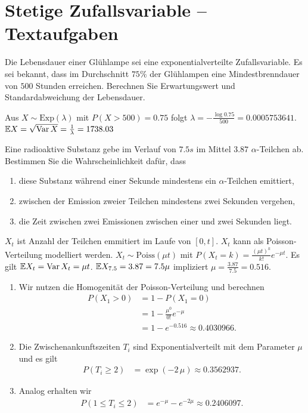 \section{Stetige Zufallsvariable -- Textaufgaben}

 Die Lebensdauer einer Glühlampe sei
eine exponentialverteilte Zufallsvariable.  Es sei bekannt, dass im Durchschnitt
$75\%$ der Glühlampen eine Mindestbrenndauer von $500$ Stunden erreichen.
Berechnen Sie Erwartungswert und Standardabweichung der Lebensdauer. 

\solution Aus $X \sim \text{Exp}(\lambda)$ mit $P(X>500) = 0.75$
folgt $\lambda = - \frac{\log 0.75}{ 500} = 0.0005753641$.  $\mathbb E X = \sqrt{
\operatorname{Var} X } = \frac{1}{\lambda} = 1738.03$


 Eine radioaktive Substanz gebe im Verlauf
von $7.5 s$ im Mittel $3.87$ $\alpha$-Teilchen ab. Bestimmen Sie die
Wahrscheinlichkeit dafür, dass
\begin{enumerate}
    \item diese Substanz während einer Sekunde mindestens ein
        $\alpha$-Teilchen emittiert,
    \item zwischen der Emission zweier Teilchen mindestens zwei
        Sekunden vergehen,
    \item die Zeit zwischen zwei Emissionen zwischen einer und
        zwei Sekunden liegt.
\end{enumerate}

\solution $X_t$ ist Anzahl der Teilchen emmitiert im Laufe von
$[0,t]$. $X_t$ kann als Poisson-Verteilung modelliert werden. $X_t \sim \text{Poiss}(\mu t)$ mit $P(X_t = k) = \frac{ (\mu t)^{k} }{k!} e^{- \mu
t}$. Es gilt $\mathbb E X_t = \operatorname{Var} X_t = \mu t$. $\mathbb E X_{7.5} = 3.87 = 7.5 \mu$
impliziert $\mu = \frac{3.87}{7.5} = 0.516$.
\begin{enumerate}
    \item Wir nutzen die Homogenität der Poisson-Verteilung und berechnen
        \begin{align*}
            P(X_1 > 0) &= 1 - P(X_1=0) \\
            &= 1 - \frac{\mu^0}{0!}e^{-\mu} \\ 
            &= 1-e^{-0.516} \approx 0.4030966.
        \end{align*}
    \item Die Zwischenankunftszeiten $T_i$ sind Exponentialverteilt mit dem Parameter $\mu$
        und es gilt
        \begin{align*}
            P(T_i \geq 2) &= \exp( -2 \,\mu ) \approx 0.3562937.
        \end{align*}
    \item Analog erhalten wir
        \begin{align*}
            P( 1 \leq T_i \leq 2) &= e^{-\mu}-e^{-2\mu} \approx 0.2406097.
        \end{align*}
\end{enumerate}


